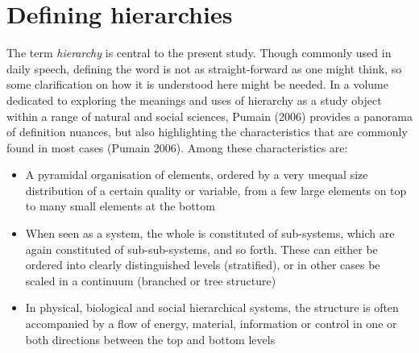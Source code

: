 \documentclass[
  12pt,
  a4paper, twoside]{book}
\begin{document}
\hypertarget{defining-hierarchies}{%
\section{Defining hierarchies}\label{defining-hierarchies}}

The term \emph{hierarchy} is central to the present study. Though commonly used in daily speech, defining the word is not as straight-forward as one might think, so some clarification on how it is understood here might be needed. In a volume dedicated to exploring the meanings and uses of hierarchy as a study object within a range of natural and social sciences, Pumain (2006) provides a panorama of definition nuances, but also highlighting the characteristics that are commonly found in most cases (Pumain 2006). Among these characteristics are:

\begin{itemize}
\item
  A pyramidal organisation of elements, ordered by a very unequal size distribution of a certain quality or variable, from a few large elements on top to many small elements at the bottom
\item
  When seen as a system, the whole is constituted of sub-systems, which are again constituted of sub-sub-systems, and so forth. These can either be ordered into clearly distinguished levels (stratified), or in other cases be scaled in a continuum (branched or tree structure)
\item
  In physical, biological and social hierarchical systems, the structure is often accompanied by a flow of energy, material, information or control in one or both directions between the top and bottom levels
\end{itemize}
\end{document}
